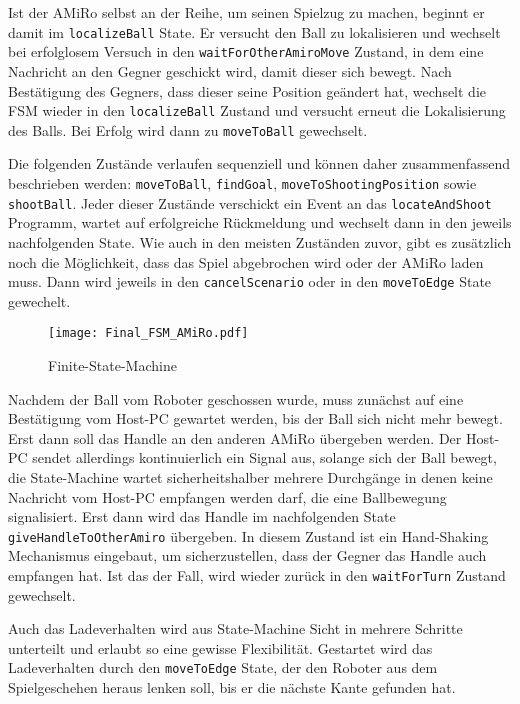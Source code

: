 Ist der AMiRo selbst an der Reihe, um seinen Spielzug zu machen, beginnt er damit im \texttt{localizeBall} State. Er versucht den Ball zu lokalisieren und wechselt bei erfolglosem Versuch in den \texttt{waitForOtherAmiroMove} Zustand, in dem eine Nachricht an den Gegner geschickt wird, damit dieser sich bewegt. Nach Bestätigung des Gegners, dass dieser seine Position geändert hat, wechselt die FSM wieder in den \texttt{localizeBall} Zustand und versucht erneut die Lokalisierung des Balls. Bei Erfolg wird dann zu \texttt{moveToBall} gewechselt.

Die folgenden Zustände verlaufen sequenziell und können daher zusammenfassend beschrieben werden:
\texttt{moveToBall}, \texttt{findGoal}, \texttt{moveToShootingPosition} sowie \texttt{shootBall}. Jeder dieser Zustände verschickt ein Event an das \texttt{locateAndShoot} Programm, wartet auf erfolgreiche Rückmeldung und wechselt dann in den jeweils nachfolgenden State. Wie auch in den meisten Zuständen zuvor, gibt es zusätzlich noch die Möglichkeit, dass das Spiel abgebrochen wird oder der AMiRo laden muss. Dann wird jeweils in den \texttt{cancelScenario} oder in den \texttt{moveToEdge} State gewechelt.

\begin{figure}[h]
	\begin{center}
		\texttt{[image: Final\_FSM\_AMiRo.pdf]}
		\caption{Finite-State-Machine}
		\label{fig:fsm-amiro}
	\end{center}
\end{figure}

Nachdem der Ball vom Roboter geschossen wurde, muss zunächst auf eine Bestätigung vom Host-PC gewartet werden, bis der Ball sich nicht mehr bewegt. Erst dann soll das Handle an den anderen AMiRo übergeben werden. Der Host-PC sendet allerdings kontinuierlich ein Signal aus, solange sich der Ball bewegt, die State-Machine wartet sicherheitshalber mehrere Durchgänge in denen keine Nachricht vom Host-PC empfangen werden darf, die eine Ballbewegung signalisiert. Erst dann wird das Handle im nachfolgenden State \texttt{giveHandleToOtherAmiro} übergeben. In diesem Zustand ist ein Hand-Shaking Mechanismus eingebaut, um sicherzustellen, dass der Gegner das Handle auch empfangen hat. Ist das der Fall, wird wieder zurück in den \texttt{waitForTurn} Zustand gewechselt.

Auch das Ladeverhalten wird aus State-Machine Sicht in mehrere Schritte unterteilt und erlaubt so eine gewisse Flexibilität. Gestartet wird das Ladeverhalten durch den \texttt{moveToEdge} State, der den Roboter aus dem Spielgeschehen heraus lenken soll, bis er die nächste Kante gefunden hat.

